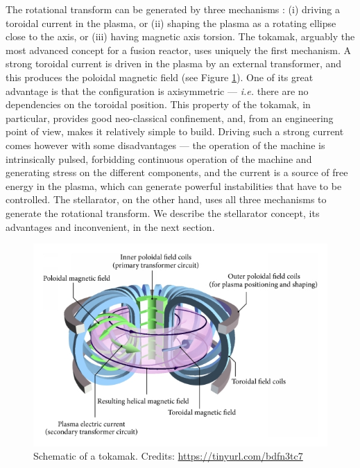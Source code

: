 \documentclass[my_thesis.tex]{subfiles}
\begin{document}
The rotational transform can be generated by three mechanisms \citep{Helander2014}: (i) driving a toroidal current in the plasma, or (ii) shaping the plasma as a rotating ellipse close to the axis, or (iii) having magnetic axis torsion. The tokamak, arguably the most advanced concept for a fusion reactor, uses uniquely the first mechanism. A strong toroidal current is driven in the plasma by an external transformer, and this produces the poloidal magnetic field (see Figure \ref{fig tokamak sketch}). One of its great advantage is that the configuration is axisymmetric --- \textit{i.e.} there are no dependencies on the toroidal position. This property of the tokamak, in particular, provides good neo-classical confinement, and, from an engineering point of view, makes it relatively simple to build. Driving such a strong current comes however with some disadvantages --- the operation of the machine is intrinsically pulsed, forbidding continuous operation of the machine and generating stress on the different components, and the current is a source of free energy in the plasma, which can generate powerful instabilities that have to be controlled. The stellarator, on the other hand, uses all three mechanisms to generate the rotational transform. We describe the stellarator concept, its advantages and inconvenient, in the next section.


\begin{figure}
    \centering
    \includegraphics[width=\linewidth]{images/Introduction/TokamakSketch.jpg}
    \caption{Schematic of a tokamak. Credits: \url{https://tinyurl.com/bdfn3tc7}}
    \label{fig tokamak sketch}
\end{figure}
\end{document}
